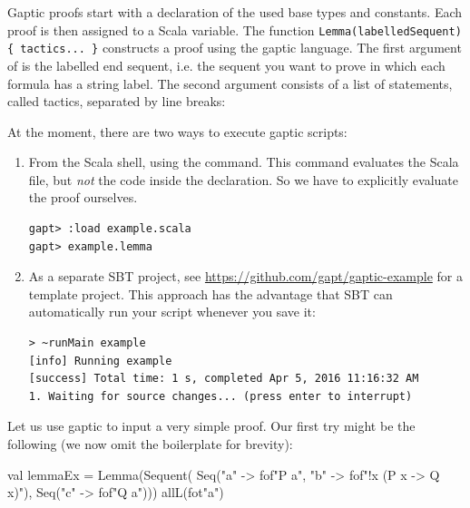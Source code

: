 \documentclass[a4paper,11pt]{article}
\newcommand{\cli}[1]{{\ttfamily {#1}}}
\begin{document}
Gaptic proofs start with a declaration of the used base types and constants.
Each proof is then assigned to a Scala variable.  The function
\verb,Lemma(labelledSequent) { tactics... }, constructs a proof using the
gaptic language.  The first argument of \cli{Lemma} is the labelled end
sequent, i.e. the sequent you want to prove in which each formula has a string
label.  The second argument consists of a list of statements, called tactics,
separated by line breaks:

At the moment, there are two ways to execute gaptic scripts:
\begin{enumerate}

  \item From the Scala shell, using the \cli{:load} command.  This command
    evaluates the Scala file, but \emph{not} the code inside the \cli{object}
    declaration.  So we have to explicitly evaluate the proof ourselves.
\begin{lstlisting}
gapt> :load example.scala
gapt> example.lemma
\end{lstlisting}

  \item As a separate SBT project, see
    \url{https://github.com/gapt/gaptic-example} for a template project.  This
approach has the advantage that SBT can automatically run your script whenever
you save it:
\begin{lstlisting}
> ~runMain example
[info] Running example 
[success] Total time: 1 s, completed Apr 5, 2016 11:16:32 AM
1. Waiting for source changes... (press enter to interrupt)
\end{lstlisting}

\end{enumerate}

Let us use gaptic to input a very simple proof.  Our first try might be the
following (we now omit the boilerplate for brevity):
\begin{tacticslisting}
val lemmaEx =
  Lemma(Sequent(
      Seq("a" -> fof"P a", "b" -> fof"!x (P x -> Q x)"),
      Seq("c" -> fof"Q a"))) {
    allL(fot"a")
  }
\end{tacticslisting}
\end{document}
